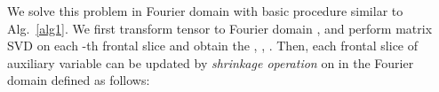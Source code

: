 \documentclass[10pt,twocolumn,letterpaper]{article}
\begin{document}
We solve this problem in Fourier domain with basic procedure similar to Alg.~\ref{alg1}. We first transform tensor  to Fourier domain , and perform matrix SVD on each -th frontal slice  and obtain the , , . Then, each frontal slice  of auxiliary variable can be updated by \textit{shrinkage operation} \cite{cai2010a,kolda2009tensor} on  in the Fourier domain defined as follows:  
\begin{table*}[h]
	\begin{center}
\end{center}
\end{table*}
\end{document}
